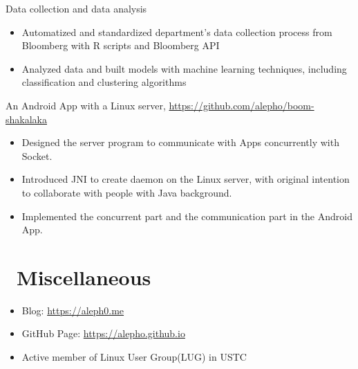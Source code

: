\documentclass{resume}
\begin{document}
 \null
Data collection and data analysis
\begin{itemize}
  \item Automatized and standardized department's data collection process from Bloomberg with R scripts and Bloomberg API
  \item Analyzed data and built models with machine learning techniques, including classification and clustering algorithms
\end{itemize}

An Android App with a Linux server, \href{https://github.com/alepho/boom-shakalaka}{https://github.com/alepho/boom-shakalaka}
\begin{itemize}
  \item Designed the server program to communicate with Apps concurrently with Socket.  
  \item Introduced JNI to create daemon on the Linux server, with original intention to collaborate with people with Java background.
  \item Implemented the concurrent part and the communication part in the Android App.
\end{itemize}





\section{\texorpdfstring{\faInfo}\ \ Miscellaneous}
\begin{itemize}[parsep=0.5ex]
  \item Blog: \href{https://aleph0.me}{https://aleph0.me}
  \item GitHub Page: \href{https://alepho.github.io}{https://alepho.github.io}
  \item Active member of Linux User Group(LUG) in USTC
\end{itemize}

%
%
\end{document}
